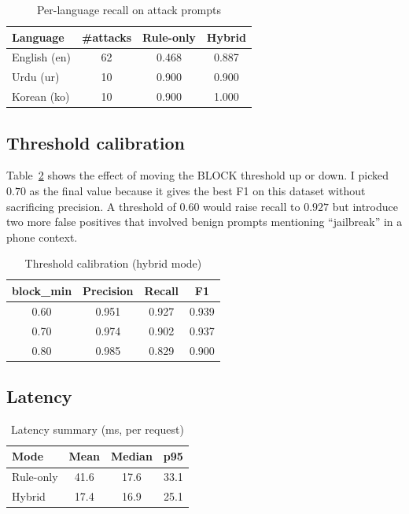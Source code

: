 \documentclass[conference]{IEEEtran}
\begin{document}
\begin{table}[t]
\caption{Per-language recall on attack prompts}
\label{tab:multi}
\centering
\footnotesize
\begin{tabular}{lccc}
\toprule
\textbf{Language} & \textbf{\#attacks} & \textbf{Rule-only} & \textbf{Hybrid} \\
\midrule
English (en) & 62 & 0.468 & 0.887 \\
Urdu (ur)    & 10 & 0.900 & 0.900 \\
Korean (ko)  & 10 & 0.900 & 1.000 \\
\bottomrule
\end{tabular}
\end{table}

\subsection{Threshold calibration}
Table~\ref{tab:threshold} shows the effect of moving the BLOCK
threshold up or down. I picked $0.70$ as the final value because it
gives the best F1 on this dataset without sacrificing precision. A
threshold of $0.60$ would raise recall to $0.927$ but introduce
two more false positives that involved benign prompts mentioning
``jailbreak'' in a phone context.

\begin{table}[t]
\caption{Threshold calibration (hybrid mode)}
\label{tab:threshold}
\centering
\footnotesize
\begin{tabular}{cccc}
\toprule
\textbf{block\_min} & \textbf{Precision} & \textbf{Recall} & \textbf{F1} \\
\midrule
0.60 & 0.951 & 0.927 & 0.939 \\
0.70 & 0.974 & 0.902 & 0.937 \\
0.80 & 0.985 & 0.829 & 0.900 \\
\bottomrule
\end{tabular}
\end{table}

\subsection{Latency}

\begin{table}[t]
\caption{Latency summary (ms, per request)}
\label{tab:latency}
\centering
\footnotesize
\begin{tabular}{lccc}
\toprule
\textbf{Mode} & \textbf{Mean} & \textbf{Median} & \textbf{p95} \\
\midrule
Rule-only & 41.6 & 17.6 & 33.1 \\
Hybrid    & 17.4 & 16.9 & 25.1 \\
\bottomrule
\end{tabular}
\end{table}
\end{document}
